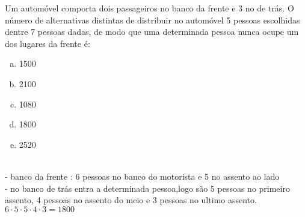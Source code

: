 \begin{ex}
 Um automóvel comporta dois passageiros no banco da frente e 3 no de trás. O número de alternativas distintas de distribuir no automóvel 5 pessoas escolhidas dentre 7 pessoas dadas, de modo que uma determinada pessoa nunca ocupe um dos lugares da frente é:
    \begin{enumerate}[(a)]
    \item 1500
    \item 2100
    \item 1080
    \item 1800
    \item 2520
    \end{enumerate}
       \begin{sol}
       \phantom{A}  \\
        - banco da frente : 6 pessoas no banco do motorista e 5 no assento ao lado \\
        - no banco de trás entra a determinada pessoa,logo são 5 pessoas no primeiro assento, 4 pessoas no assento do meio e 3 pessoas no ultimo assento. 
        $6\cdot5\cdot5\cdot4\cdot3=1800$
       
        
       
       \end{sol}
\end{ex}